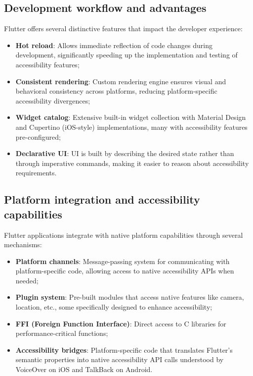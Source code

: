 \subsection{Development workflow and advantages}
Flutter offers several distinctive features that impact the developer experience:
\begin{itemize}
    \item \textbf{Hot reload}: Allows immediate reflection of code changes during development, significantly speeding up the implementation and testing of accessibility features;
    \item \textbf{Consistent rendering}: Custom rendering engine ensures visual and behavioral consistency across platforms, reducing platform-specific accessibility divergences;
    \item \textbf{Widget catalog}: Extensive built-in widget collection with Material Design and Cupertino (iOS-style) implementations, many with accessibility features pre-configured;
    \item \textbf{Declarative UI}: UI is built by describing the desired state rather than through imperative commands, making it easier to reason about accessibility requirements.
\end{itemize}

\subsection{Platform integration and accessibility capabilities}
Flutter applications integrate with native platform capabilities through several mechanisms:
\begin{itemize}
    \item \textbf{Platform channels}: Message-passing system for communicating with platform-specific code, allowing access to native accessibility APIs when needed;
    \item \textbf{Plugin system}: Pre-built modules that access native features like camera, location, etc., some specifically designed to enhance accessibility;
    \item \textbf{FFI (Foreign Function Interface)}: Direct access to C libraries for performance-critical functions;
    \item \textbf{Accessibility bridges}: Platform-specific code that translates Flutter's semantic properties into native accessibility API calls understood by VoiceOver on iOS and TalkBack on Android.
\end{itemize}

